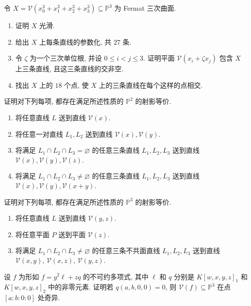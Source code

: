 \BookExerciseHeading
\begin{BookExercises}
  \item\label{ex:twenty-seven-lines-on-the-fermat-cubic} 令 $X=\mathcal{V}(x_{0}^{3}+x_{1}^{3}+x_{2}^{3}+x_{3}^{3})\subseteq\mathbb{P}^{3}$ 为 Fermat 三次曲面.
  \begin{enumerate}
    \item 证明 $X$ 光滑.
    \item 给出 $X$ 上每条直线的参数化, 共 $27$ 条.
    \item 令 $\zeta$ 为一个三次单位根, 并设 $0\le i<j\le3$. 证明平面 $\mathcal{V}(x_{i}+\zeta x_{j})$ 包含 $X$ 上三条直线, 且这三条直线的交非空.
    \item 找出 $X$ 上的 $18$ 个点, 使 $X$ 上的三条直线在每个这样的点相交.
  \end{enumerate}
  \item\label{ex:projective-equivalences-of-plane-line-configurations} 证明对下列每项, 都存在满足所述性质的 $\mathbb{P}^{2}$ 的射影等价.
  \begin{enumerate}
    \item 将任意直线 $L$ 送到直线 $\mathcal{V}(x)$.
    \item 将任意一对直线 $L_{1},L_{2}$ 送到直线 $\mathcal{V}(x),\mathcal{V}(y)$.
    \item 将满足 $L_{1}\cap L_{2}\cap L_{3}=\varnothing$ 的任意三条直线 $L_{1},L_{2},L_{3}$ 送到直线 $\mathcal{V}(x),\mathcal{V}(y),\mathcal{V}(z)$.
    \item 将满足 $L_{1}\cap L_{2}\cap L_{3}\ne\varnothing$ 的任意三条直线 $L_{1},L_{2},L_{3}$ 送到直线 $\mathcal{V}(x),\mathcal{V}(y),\mathcal{V}(x+y)$.
  \end{enumerate}
  \item\label{ex:projective-equivalences-of-three-space-configurations} 证明对下列每项, 都存在满足所述性质的 $\mathbb{P}^{3}$ 的射影等价.
  \begin{enumerate}
    \item 将任意直线 $L$ 送到直线 $\mathcal{V}(y,z)$.
    \item 将任意平面 $P$ 送到平面 $\mathcal{V}(z)$.
    \item 将满足 $L_{1}\cap L_{2}\cap L_{3}\ne\varnothing$ 的任意三条不共面直线 $L_{1},L_{2},L_{3}$ 送到直线 $\mathcal{V}(x,y)$, $\mathcal{V}(x,z)$, $\mathcal{V}(y,z)$.
  \end{enumerate}
  \item\label{ex:repeated-line-in-plane-section-produces-singularity} 设 $f$ 为形如 $f=y^{2}\ell+zq$ 的不可约多项式, 其中 $\ell$ 和 $q$ 分别是 $K[w,x,y,z]_{1}$ 和 $K[w,x,y,z]_{2}$ 中的非零元素. 证明若 $q(a,b,0,0)=0$, 则 $\mathcal{V}(f)\subseteq\mathbb{P}^{3}$ 在点 $[a:b:0:0]$ 处奇异.

\end{BookExercises}
